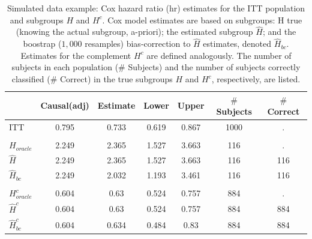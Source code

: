 \documentclass[12pt]{article}
\begin{document}
\begin{table}

\caption{\label{tab:simex_tab}\label{tab:simex} Simulated data example: Cox hazard ratio (hr) estimates for the ITT population and subgroups $H$ and $H^{c}$.
Cox model estimates are based on subgroups: H true (knowing the actual subgroup, a-priori); the estimated subgroup $\hat{H}$; and 
the boostrap ($1,000$ resamples) bias-correction to $\hat{H}$ estimates, denoted $\hat{H}_{bc}$.  Estimates for the complement $H^{c}$ are defined analogously.
The number of subjects in each population ($\#$ Subjects) and the number of subjects correctly classified ($\#$ Correct) in the true subgroups $H$ and $H^{c}$, respectively, are listed.}
\centering
\fontsize{9}{11}\selectfont
\begin{tabular}[t]{lcccccc}
\toprule
  & Causal(adj) & Estimate & Lower & Upper & $\#$ Subjects & $\#$ Correct\\
\midrule
ITT & 0.795 & 0.733 & 0.619 & 0.867 & 1000 & .\\
\addlinespace[0.3em]
\multicolumn{7}{l}{\textbf{H subgroup estimates}}\\
\hspace{1em}$H_{oracle}$ & 2.249 & 2.365 & 1.527 & 3.663 & 116 & .\\
\hspace{1em}$\hat{H}$ & 2.249 & 2.365 & 1.527 & 3.663 & 116 & 116\\
\hspace{1em}$\hat{H}_{bc}$ & 2.249 & 2.032 & 1.193 & 3.461 & 116 & 116\\
\addlinespace[0.3em]
\multicolumn{7}{l}{\textbf{H-complement subgroup estimates}}\\
\hspace{1em}$H^{c}_{oracle}$ & 0.604 & 0.63 & 0.524 & 0.757 & 884 & .\\
\hspace{1em}$\hat{H}^{c}$ & 0.604 & 0.63 & 0.524 & 0.757 & 884 & 884\\
\hspace{1em}$\hat{H}^{c}_{bc}$ & 0.604 & 0.634 & 0.484 & 0.83 & 884 & 884\\
\bottomrule
\end{tabular}
\end{table}




 

\end{document}
